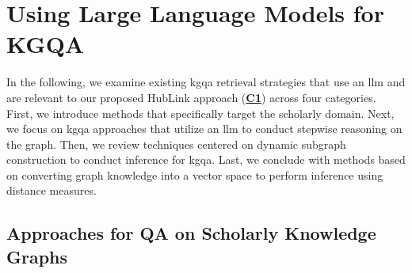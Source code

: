 




\section{Using Large Language Models for KGQA}

In the following, we examine existing \gls{kgqa} retrieval strategies that use an \gls{llm} and are relevant to our proposed HubLink approach (\hyperref[enum:c1]{\textbf{C1}}) across four categories. First, we introduce methods that specifically target the scholarly domain. Next, we focus on \gls{kgqa} approaches that utilize an \gls{llm} to conduct stepwise reasoning on the graph. Then, we review techniques centered on dynamic subgraph construction to conduct inference for \gls{kgqa}. Last, we conclude with methods based on converting graph knowledge into a vector space to perform inference using distance measures.

\subsection{Approaches for QA on Scholarly Knowledge Graphs}
\label{sec:related_work_kgqa_on_scholarly}

